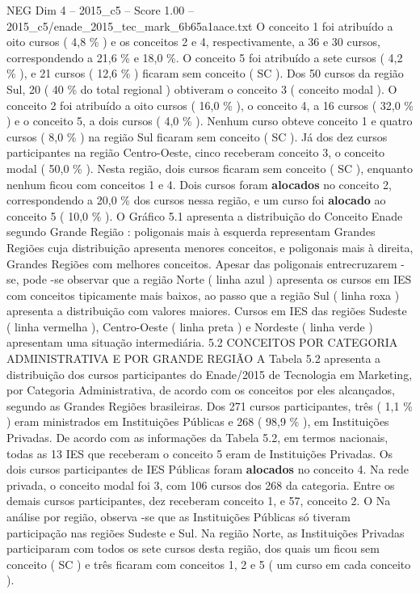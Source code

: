 \begin{textsample}{NEG Dim 4 – 2015\_c5 – Score 1.00 – 2015\_c5/enade\_2015\_tec\_mark\_6b65a1aace.txt}
O conceito 1 foi atribuído a oito cursos ( 4,8 \% ) e os conceitos 2 e 4, respectivamente, a 36 e 30 cursos, correspondendo a 21,6 \% e 18,0 \%.
O conceito 5 foi atribuído a sete cursos ( 4,2 \% ), e 21 cursos ( 12,6 \% ) ficaram sem conceito ( SC ).
Dos 50 cursos da região Sul, 20 ( 40 \% do total regional ) obtiveram o conceito 3 ( conceito modal ).
O conceito 2 foi atribuído a oito cursos ( 16,0 \% ), o conceito 4, a 16 cursos ( 32,0 \% ) e o conceito 5, a dois cursos ( 4,0 \% ).
Nenhum curso obteve conceito 1 e quatro cursos ( 8,0 \% ) na região Sul ficaram sem conceito ( SC ).
Já dos dez cursos participantes na região Centro-Oeste, cinco receberam conceito 3, o conceito modal ( 50,0 \% ).
Nesta região, dois cursos ficaram sem conceito ( SC ), enquanto nenhum ficou com conceitos 1 e 4.
Dois cursos foram \textbf{alocados} no conceito 2, correspondendo a 20,0 \% dos cursos nessa região, e um curso foi \textbf{alocado} ao conceito 5 ( 10,0 \% ).
O Gráfico 5.1 apresenta a distribuição do Conceito Enade segundo Grande Região : poligonais mais à esquerda representam Grandes Regiões cuja distribuição apresenta menores conceitos, e poligonais mais à direita, Grandes Regiões com melhores conceitos.
Apesar das poligonais entrecruzarem -se, pode -se observar que a região Norte ( linha azul ) apresenta os cursos em IES com conceitos tipicamente mais baixos, ao passo que a região Sul ( linha roxa ) apresenta a distribuição com valores maiores.
Cursos em IES das regiões Sudeste ( linha vermelha ), Centro-Oeste ( linha preta ) e Nordeste ( linha verde ) apresentam uma situação intermediária. 5.2 CONCEITOS POR CATEGORIA ADMINISTRATIVA E POR GRANDE REGIÃO A Tabela 5.2 apresenta a distribuição dos cursos participantes do Enade/2015 de Tecnologia em Marketing, por Categoria Administrativa, de acordo com os conceitos por eles alcançados, segundo as Grandes Regiões brasileiras.
Dos 271 cursos participantes, três ( 1,1 \% ) eram ministrados em Instituições Públicas e 268 ( 98,9 \% ), em Instituições Privadas.
De acordo com as informações da Tabela 5.2, em termos nacionais, todas as 13 IES que receberam o conceito 5 eram de Instituições Privadas.
Os dois cursos participantes de IES Públicas foram \textbf{alocados} no conceito 4.
Na rede privada, o conceito modal foi 3, com 106 cursos dos 268 da categoria.
Entre os demais cursos participantes, dez receberam conceito 1, e 57, conceito 2.
O Na análise por região, observa -se que as Instituições Públicas só tiveram participação nas regiões Sudeste e Sul.
Na região Norte, as Instituições Privadas participaram com todos os sete cursos desta região, dos quais um ficou sem conceito ( SC ) e três ficaram com conceitos 1, 2 e 5 ( um curso em cada conceito ).

\end{textsample}
